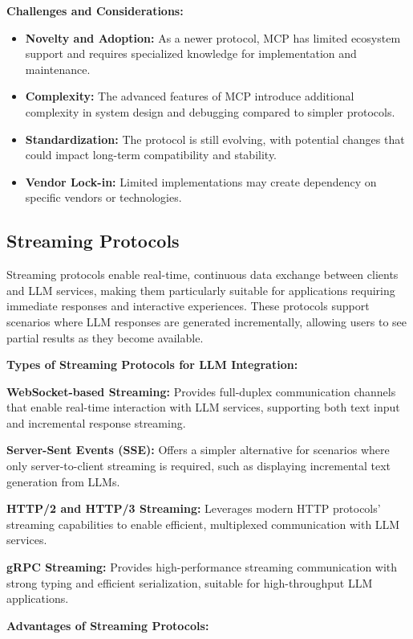 \textbf{Challenges and Considerations:}

\begin{itemize}
    \item \textbf{Novelty and Adoption:} As a newer protocol, MCP has limited ecosystem support and requires specialized knowledge for implementation and maintenance.
    \item \textbf{Complexity:} The advanced features of MCP introduce additional complexity in system design and debugging compared to simpler protocols.
    \item \textbf{Standardization:} The protocol is still evolving, with potential changes that could impact long-term compatibility and stability.
    \item \textbf{Vendor Lock-in:} Limited implementations may create dependency on specific vendors or technologies.
\end{itemize}

\subsection{Streaming Protocols}

Streaming protocols enable real-time, continuous data exchange between clients and LLM services, making them particularly suitable for applications requiring immediate responses and interactive experiences. These protocols support scenarios where LLM responses are generated incrementally, allowing users to see partial results as they become available.

\textbf{Types of Streaming Protocols for LLM Integration:}

\textbf{WebSocket-based Streaming:} Provides full-duplex communication channels that enable real-time interaction with LLM services, supporting both text input and incremental response streaming.

\textbf{Server-Sent Events (SSE):} Offers a simpler alternative for scenarios where only server-to-client streaming is required, such as displaying incremental text generation from LLMs.

\textbf{HTTP/2 and HTTP/3 Streaming:} Leverages modern HTTP protocols' streaming capabilities to enable efficient, multiplexed communication with LLM services.

\textbf{gRPC Streaming:} Provides high-performance streaming communication with strong typing and efficient serialization, suitable for high-throughput LLM applications.

\textbf{Advantages of Streaming Protocols:}

